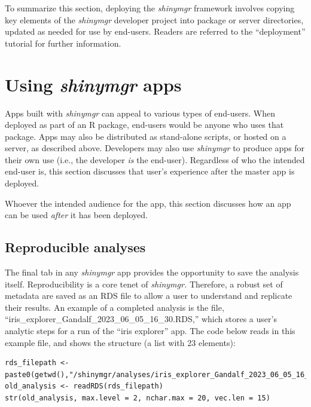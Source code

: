 To summarize this section, deploying the \emph{shinymgr} framework involves copying key elements of the \emph{shinymgr} developer project into package or server directories, updated as needed for use by end-users. Readers are referred to the ``deployment'' tutorial for further information.

\section{\texorpdfstring{Using \emph{shinymgr} apps}{Using shinymgr apps}}\label{appUsing}

Apps built with \emph{shinymgr} can appeal to various types of end-users. When deployed as part of an R package, end-users would be anyone who uses that package. Apps may also be distributed as stand-alone scripts, or hosted on a server, as described above. Developers may also use \emph{shinymgr} to produce apps for their own use (i.e., the developer \emph{is} the end-user). Regardless of who the intended end-user is, this section discusses that user's experience after the master app is deployed.

Whoever the intended audience for the app, this section discusses how an app can be used \emph{after} it has been deployed.

\subsection{Reproducible analyses}\label{reproducible-analyses}

The final tab in any \emph{shinymgr} app provides the opportunity to save the analysis itself. Reproducibility is a core tenet of \emph{shinymgr.} Therefore, a robust set of metadata are saved as an RDS file to allow a user to understand and replicate their results. An example of a completed analysis is the file, ``iris\_explorer\_Gandalf\_2023\_06\_05\_16\_30.RDS,'' which stores a user's analytic steps for a run of the ``iris explorer'' app. The code below reads in this example file, and shows the structure (a list with 23 elements):

\begin{verbatim}
rds_filepath <- paste0(getwd(),"/shinymgr/analyses/iris_explorer_Gandalf_2023_06_05_16_30.RDS")
old_analysis <- readRDS(rds_filepath)
str(old_analysis, max.level = 2, nchar.max = 20, vec.len = 15)
\end{verbatim}


